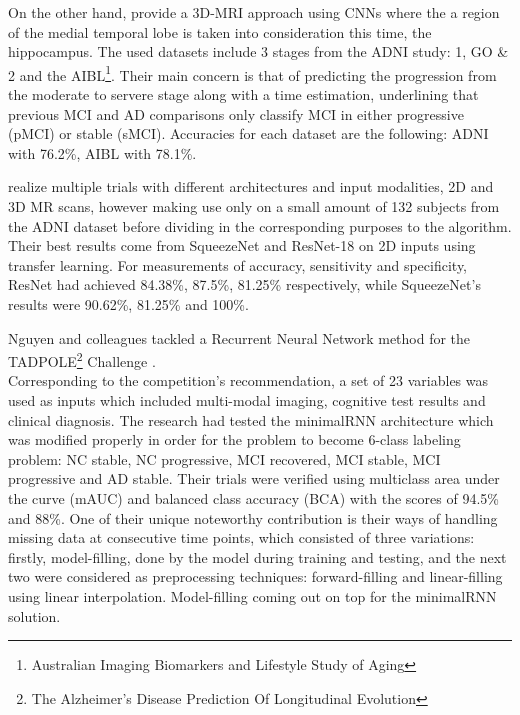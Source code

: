 \documentclass[a4paper, 12pt]{article}
\begin{document}
On the other hand, \cite{PMID-31201098} provide a 3D-MRI approach using CNNs where the a region of the medial temporal lobe
is taken into consideration this time, the hippocampus. The used datasets include 3 stages from the ADNI study: 1, GO \& 2 and
the AIBL\footnote{Australian Imaging Biomarkers and Lifestyle Study of Aging}. Their main concern is that of predicting the
progression from the moderate to servere stage along with a time estimation, underlining that previous MCI and AD comparisons
only classify MCI in either progressive (pMCI) or stable (sMCI). Accuracies for each dataset are the following: ADNI with
76.2\%, AIBL with 78.1\%.

\cite{10.1117/1.JMI.8.2.024503} realize multiple trials with different architectures and input modalities, 2D and 3D MR scans,
however making use only on a small amount of 132 subjects from the ADNI dataset before dividing in the corresponding purposes
to the algorithm. Their best results come from SqueezeNet and ResNet-18 on 2D inputs using transfer learning.
For measurements of accuracy, sensitivity and specificity, ResNet had achieved 84.38\%, 87.5\%, 81.25\% respectively, while
SqueezeNet's results were 90.62\%, 81.25\% and 100\%.


Nguyen and colleagues tackled a Recurrent Neural Network method for the TADPOLE\footnote{The Alzheimer's Disease Prediction
    Of Longitudinal Evolution} Challenge \cite{NGUYEN2020117203}. \\
Corresponding to the competition's recommendation, a set of 23 variables was used as inputs which included multi-modal
imaging, cognitive test results and clinical diagnosis. The research had tested the minimalRNN architecture \cite{Chen2017MinimalRNNTM}
which was modified properly in order for the problem to become 6-class labeling problem: NC stable, NC progressive, MCI recovered,
MCI stable, MCI progressive and AD stable. Their trials were verified using multiclass area under the curve (mAUC) and balanced
class accuracy (BCA) with the scores of 94.5\% and 88\%. One of their unique noteworthy contribution is their ways of
handling missing data at consecutive time points, which consisted of three variations: firstly, model-filling, done by the model
during training and testing, and the next two were considered as preprocessing techniques: forward-filling and linear-filling using linear
interpolation. Model-filling coming out on top for the minimalRNN solution.
\end{document}

